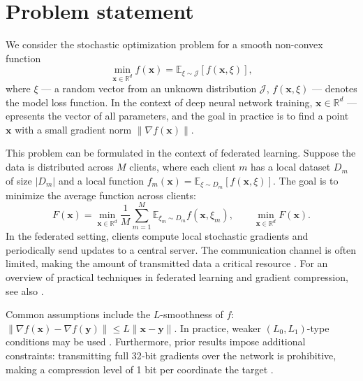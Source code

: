 \documentclass{article}
\begin{document}
\section{Problem statement}\label{sec:prostate}
We consider the stochastic optimization problem for a smooth non-convex function
\begin{equation}
\min_{\mathbf{x}\in\mathbb{R}^d} f(\mathbf{x})=\mathbb{E}_{\xi\sim\mathcal{J}}[f(\mathbf{x},\xi)],
\end{equation}
where  $\xi$ — a random vector from an unknown distribution $\mathcal{J}$, $f(\mathbf{x},\xi)$ — denotes the model loss function. In the context of deep neural network training, $\mathbf{x}\in\mathbb{R}^d$ — epresents the vector of all parameters, and the goal in practice is to find a point $\mathbf{x}$ with a small gradient norm $\|\nabla f(\mathbf{x})\|$.

This problem can be formulated in the context of federated learning. Suppose the data is distributed across $M$ clients, where each client $m$ has a local dataset $D_m$ of size $|D_m|$ and a local function $f_m(\mathbf{x}) = \mathbb{E}_{\xi \sim D_m}[f(\mathbf{x}, \xi)]$. The goal is to minimize the average function across clients:
\begin{equation}
F(\mathbf{x})=\min_{\mathbf{x}\in\mathbb{R}^d}\frac{1}{M}\sum_{m=1}^M\mathbb{E}_{\xi_m \sim D_m}f(\mathbf{x}, \xi_m),\qquad \min_{\mathbf{x}\in\mathbb{R}^d} F(\mathbf{x}).
\end{equation}
In the federated setting, clients compute local stochastic gradients and periodically send updates to a central server. The communication channel is often limited, making the amount of transmitted data a critical resource \cite{horvath2023quantization, bernstein2018signsgd}. For an overview of practical techniques in federated learning and gradient compression, see also \cite{bernstein2018signsgd, bernstein2019majority, horvath2023quantization}.

Common assumptions include the $L$-smoothness of $f$:
$\|\nabla f(\mathbf{x})-\nabla f(\mathbf{y})\|\le L\|\mathbf{x}-\mathbf{y}\|.
$ In practice, weaker $(L_0,L_1)$-type conditions may be used \cite{pethick2025gradnorm}. Furthermore, prior results impose additional constraints: transmitting full 32‑bit gradients over the network is prohibitive, making a compression level of 1 bit per coordinate the target \cite{bernstein2018signsgd, bernstein2019majority}.
\end{document}
